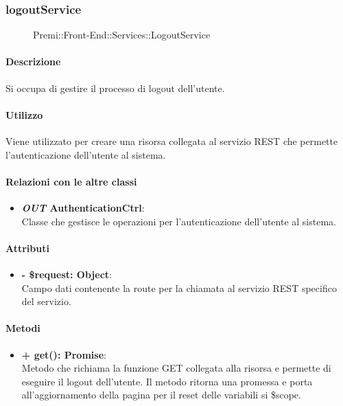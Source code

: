 	
\subsubsection{logoutService}
	\begin{figure}[h]
		\centering
		\caption[Premi::Front-End::Services::LogoutService]{Premi::Front-End::Services::LogoutService}
	\end{figure}
	
	\paragraph{Descrizione}
	Si occupa di gestire il processo di logout dell'utente.
	
	\paragraph{Utilizzo}
	Viene utilizzato per creare una risorsa collegata al servizio REST che permette l'autenticazione dell'utente al sistema.
	
	\paragraph{Relazioni con le altre classi}
	\begin{itemize}
		\item \textbf{\textit{OUT} AuthenticationCtrl}:\\
		Classe che gestisce le operazioni per l'autenticazione dell'utente al sistema.
	\end{itemize}
	
	\paragraph{Attributi}
	\begin{itemize}
		\item \textbf{- \$request: Object}:\\
		Campo dati contenente la route per la chiamata al servizio REST specifico del servizio.
	\end{itemize}	
	
	\paragraph{Metodi}
	\begin{itemize}
		\item \textbf{+ get(): Promise}:\\
		Metodo che richiama la funzione GET collegata alla risorsa e permette di eseguire il logout dell'utente. Il metodo ritorna una promessa e porta all'aggiornamento della pagina per il reset delle variabili si \$scope.
	\end{itemize}
	
